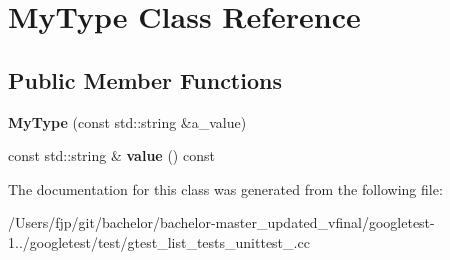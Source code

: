 \hypertarget{class_my_type}{}\section{My\+Type Class Reference}
\label{class_my_type}
\subsection*{Public Member Functions}
\begin{DoxyCompactItemize}
\item 
\mbox{\label{class_my_type_a74d6f29a06e298321a6e5f0b91b020e7}} 
{\bfseries My\+Type} (const std\+::string \&a\+\_\+value)
\item 
\mbox{\label{class_my_type_a04eaace57f0ecd8ee8898defbdee31b4}} 
const std\+::string \& {\bfseries value} () const
\end{DoxyCompactItemize}


The documentation for this class was generated from the following file\+:\begin{DoxyCompactItemize}
\item 
/\+Users/fjp/git/bachelor/bachelor-\/master\+\_\+updated\+\_\+vfinal/googletest-\/1../googletest/test/gtest\+\_\+list\+\_\+tests\+\_\+unittest\+\_\+.\+cc\end{DoxyCompactItemize}

